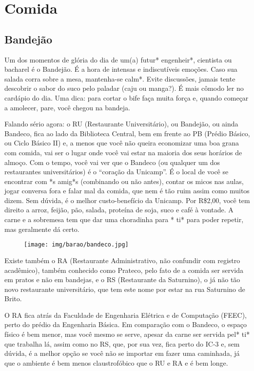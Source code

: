 
\section{Comida}
\subsection{Bandejão}

Um dos momentos de glória do dia de um(a) futur* engenheir*, cientista ou
bacharel é o Bandejão. É a hora de intensas e indiscutíveis emoções. Caso sua
salada corra sobre a mesa, mantenha-se calm*. Evite discussões, jamais tente
descobrir o sabor do suco pelo paladar (caju ou manga?). É mais cômodo ler no
cardápio do dia. Uma dica: para cortar o bife faça muita força e, quando
começar a amolecer, pare, você chegou na bandeja.

Falando sério agora: o RU (Restaurante Universitário), ou Bandejão, ou ainda
Bandeco, fica ao lado da Biblioteca Central, bem em frente ao PB (Prédio
Básico, ou Ciclo Básico II) e, a menos que você não queira economizar uma boa
grana com comida, vai ser o lugar onde você vai estar na maioria dos seus
horários de almoço. Com o tempo, você vai ver que o Bandeco (ou qualquer um dos
restaurantes universitários) é o ``coração da Unicamp''. É o local de você se
encontrar com *s amig*s (combinando ou não antes), contar os micos nas aulas,
jogar conversa fora e falar mal da comida, que nem é tão ruim assim como muitos
dizem. Sem dúvida, é o melhor custo-benefício da Unicamp. Por R\$2,00, você tem
direito a arroz, feijão, pão, salada, proteína de soja, suco e café à vontade.
A carne e a sobremesa tem que dar uma choradinha para * ti* para poder repetir,
mas geralmente dá certo.

\begin{figure}[h!]
    \centering
    \texttt{[image: img/barao/bandeco.jpg]}
\end{figure}

Existe também o RA (Restaurante Administrativo, não confundir com registro
acadêmico), também conhecido como Prateco, pelo fato de a comida ser servida
em pratos e não em bandejas, e o RS (Restaurante da Saturnino), o já não tão
novo restaurante universitário, que tem este nome por estar na rua Saturnino de
Brito.

O RA fica atrás da Faculdade de Engenharia Elétrica e de Computação (FEEC),
perto do prédio da Engenharia Básica. Em comparação com o Bandeco, o espaço
físico é bem menor, mas você mesmo se serve, apesar da carne ser servida pel*
ti* que trabalha lá, assim como no RS, que, por sua vez, fica perto do IC-3 e,
sem dúvida, é a melhor opção se você não se importar em fazer uma caminhada, já
que o ambiente é bem menos claustrofóbico que o RU e RA e é bem longe.

